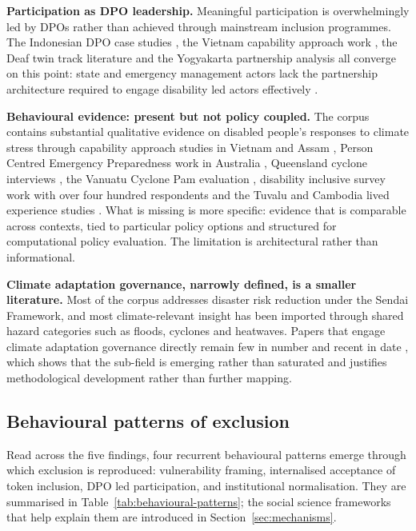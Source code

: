 \documentclass[12pt,a4paper]{report}
\begin{document}
\textbf{Participation as DPO leadership.} Meaningful participation is overwhelmingly led by DPOs rather than achieved through mainstream inclusion programmes. The Indonesian DPO case studies \cite{pertiwi2019dpo,pertiwi2022bridging,villeneuve2017dpo}, the Vietnam capability approach work \cite{ton2021agency,ton2020capabilities}, the Deaf twin track literature \cite{craig2023twintrack,cooper2021vietnam,calgaro2021silent} and the Yogyakarta partnership analysis \cite{rahatiningtyas2025yogyakarta} all converge on this point: state and emergency management actors lack the partnership architecture required to engage disability led actors effectively \cite{twigg2014attitude,ewen2025nepal}.

\textbf{Behavioural evidence: present but not policy coupled.} The corpus contains substantial qualitative evidence on disabled people's responses to climate stress through capability approach studies in Vietnam and Assam \cite{ton2020capabilities,ton2021agency,doll2025assam}, Person Centred Emergency Preparedness work in Australia \cite{villeneuve2021pcep,crapis2024australian}, Queensland cyclone interviews \cite{quaill2019queensland}, the Vanuatu Cyclone Pam evaluation \cite{webb2020vanuatu}, disability inclusive survey work with over four hundred respondents \cite{skaggs2025data} and the Tuvalu and Cambodia lived experience studies \cite{elisala2020tuvalu,gartrell2020cambodia}. What is missing is more specific: evidence that is comparable across contexts, tied to particular policy options and structured for computational policy evaluation. The limitation is architectural rather than informational.

\textbf{Climate adaptation governance, narrowly defined, is a smaller literature.} Most of the corpus addresses disaster risk reduction under the Sendai Framework, and most climate-relevant insight has been imported through shared hazard categories such as floods, cyclones and heatwaves. Papers that engage climate adaptation governance directly remain few in number and recent in date \cite{brown2025massachusetts,engelman2025california,eriksen2025rock,duke2025climatecourts,pirmasari2023halinai,alexander2025climatedisability,campbell2023rehabilitation,eaton2022mental,alexander2021daytomorrow}, which shows that the sub-field is emerging rather than saturated and justifies methodological development rather than further mapping.

\subsection{Behavioural patterns of exclusion}
\label{sec:patterns}
Read across the five findings, four recurrent behavioural patterns emerge through which exclusion is reproduced: vulnerability framing, internalised acceptance of token inclusion, DPO led participation, and institutional normalisation. They are summarised in Table~\ref{tab:behavioural-patterns}; the social science frameworks that help explain them are introduced in Section~\ref{sec:mechanisms}.
\end{document}
